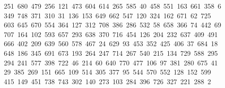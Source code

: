 \begin{tabbing}
\>\ 251\ 680\ 479\ 256\ 121\ 473\ 604\ 614\ 265\ 585\ 40\ 458\ 551\ 163\ 661\ 358\ 6\\[0pt]
\ 349\ 748\ 371\ 310\ 31\ 136\ 153\ 649\ 662\ 547\ 120\ 324\ 162\ 671\ 62\ 725\\[0pt]
\>\ 603\ 645\ 670\ 554\ 364\ 127\ 312\ 708\ 386\ 286\ 532\ 58\ 658\ 366\ 74\ 442\ 69\\[0pt]
\ 707\ 164\ 102\ 593\ 657\ 293\ 638\ 370\ 716\ 454\ 126\ 204\ 232\ 637\ 409\ 491\\[0pt]
\>\ 666\ 402\ 209\ 639\ 560\ 578\ 467\ 24\ 629\ 93\ 453\ 352\ 425\ 406\ 37\ 684\ 18\\[0pt]
\ 648\ 186\ 345\ 691\ 673\ 193\ 264\ 247\ 714\ 267\ 540\ 215\ 134\ 729\ 588\ 295\\[0pt]
\>\ 294\ 241\ 577\ 398\ 722\ 46\ 214\ 60\ 640\ 770\ 477\ 106\ 97\ 381\ 280\ 675\ 41\\[0pt]
\ 29\ 385\ 269\ 151\ 665\ 109\ 514\ 305\ 377\ 95\ 544\ 570\ 552\ 128\ 152\ 599\ \\[0pt]
\ 415\ 149\ 451\ 738\ 743\ 302\ 140\ 273\ 103\ 284\ 396\ 726\ 327\ 221\ 288\ 2\\[0pt]

\end{tabbing}
